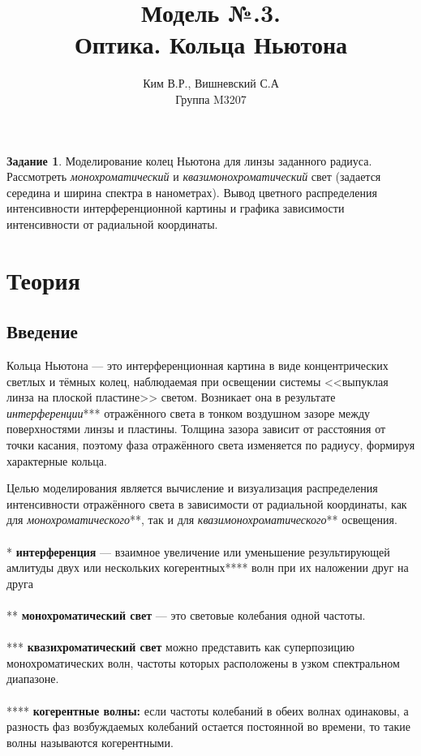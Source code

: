 \documentclass[a4paper,11pt]{article}
\title{Модель №.3. \\ Оптика. Кольца Ньютона }
\author{Ким В.Р., Вишневский С.А \\ Группа M3207 }
\date{}
\theoremstyle{definition}
\newtheorem*{task}{Задание}\setlength{\parindent}{0pt}
\begin{document}
    \maketitle

    \begin{task}
        Моделирование колец Ньютона для линзы заданного радиуса.
        Рассмотреть \textit{монохроматический} и \textit{квазимонохроматический} свет
        (задается середина и ширина спектра в нанометрах). Вывод цветного
        распределения интенсивности интерференционной картины и графика
        зависимости интенсивности от радиальной координаты.
    \end{task}


    \section{Теория}

    \subsection{Введение}
    Кольца Ньютона — это интерференционная картина в виде концентрических светлых
    и тёмных колец, наблюдаемая при освещении системы <<выпуклая линза на плоской пластине>> светом.
    Возникает она в результате \textit{интерференции}*** отражённого света в тонком воздушном зазоре между
    поверхностями линзы и пластины. Толщина зазора зависит от расстояния от точки касания,
    поэтому фаза отражённого света изменяется по радиусу, формируя характерные кольца.

    Целью моделирования является вычисление и визуализация распределения интенсивности отражённого света
    в зависимости от радиальной координаты, как для \textit{монохроматического}**, так и для
    \textit{квазимонохроматического}** освещения.
    \\
    \\
    * \textbf{интерференция} — взаимное увеличение или уменьшение результирующей амлитуды двух или нескольких
    когерентных**** волн при их наложении друг на друга
    \\
    \\
    ** \textbf{монохроматический свет} — это световые колебания одной частоты.
    \\
    \\
    *** \textbf{квазихроматический свет} можно представить как суперпозицию монохроматических волн, частоты которых
    расположены в узком спектральном диапазоне.
    \\
    \\
    **** \textbf{когерентные волны:} если частоты колебаний в обеих волнах одинаковы, а разность фаз возбуждаемых колебаний
    остается постоянной во времени, то такие волны называются когерентными.
\end{document}

